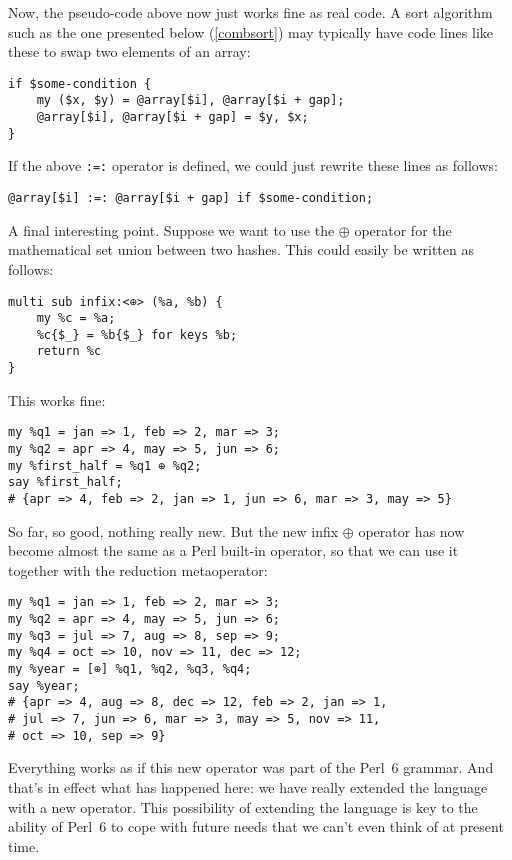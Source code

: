 Now, the pseudo-code above now just works fine as real code. 
A sort algorithm such as the one presented below 
(\ref{combsort}) may typically have code lines 
like these to swap two elements of an array:

\begin{verbatim}
if $some-condition {
    my ($x, $y) = @array[$i], @array[$i + gap];
    @array[$i], @array[$i + gap] = $y, $x;
}
\end{verbatim}

If the above  \verb':=:' operator is defined, we 
could just rewrite these lines as follows:

\begin{verbatim}
@array[$i] :=: @array[$i + gap] if $some-condition;
\end{verbatim}

A final interesting point. Suppose we want to use 
the $\oplus$ operator for the mathematical set 
union between two hashes. This could easily be 
written as follows:

\begin{verbatim}
multi sub infix:<⊕> (%a, %b) {
    my %c = %a;
    %c{$_} = %b{$_} for keys %b;
    return %c
}
\end{verbatim}

This works fine:

\begin{verbatim}
my %q1 = jan => 1, feb => 2, mar => 3;
my %q2 = apr => 4, may => 5, jun => 6;
my %first_half = %q1 ⊕ %q2;
say %first_half;
# {apr => 4, feb => 2, jan => 1, jun => 6, mar => 3, may => 5}
\end{verbatim}

So far, so good, nothing really new. But the new 
infix $\oplus$ operator has now become almost the same 
as a Perl built-in operator, so that we can use it 
together with the reduction metaoperator:

\begin{verbatim}
my %q1 = jan => 1, feb => 2, mar => 3;
my %q2 = apr => 4, may => 5, jun => 6;
my %q3 = jul => 7, aug => 8, sep => 9;
my %q4 = oct => 10, nov => 11, dec => 12;
my %year = [⊕] %q1, %q2, %q3, %q4;
say %year;
# {apr => 4, aug => 8, dec => 12, feb => 2, jan => 1, 
# jul => 7, jun => 6, mar => 3, may => 5, nov => 11, 
# oct => 10, sep => 9}
\end{verbatim}

Everything works as if this new operator was part 
of the Perl~6 grammar. And that's in effect what 
has happened here: we have really extended the 
language with a new operator. This possibility of 
extending the language is key to the ability of  
Perl~6 to cope with future needs that we can't even 
think of at present time.

